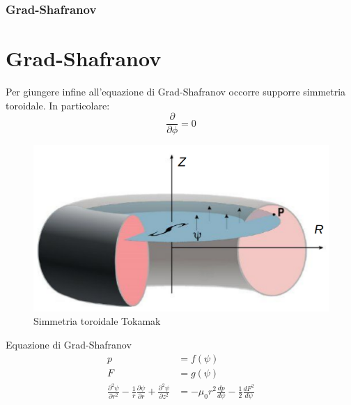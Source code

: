 \documentclass{beamer}
\begin{document}
\begin{frame}
	\frametitle{Grad-Shafranov}
	\section{Grad-Shafranov}
	\begin{minipage}[t]{0.50\textwidth}
		Per giungere infine all'equazione di Grad-Shafranov occorre supporre simmetria toroidale. In particolare:
		\begin{equation*}
			\frac{\partial}{\partial \phi}=0
		\end{equation*}

	\end{minipage}
	\begin{minipage}[t]{0.40\textwidth}
		\begin{figure}
			\includegraphics[scale=0.25]{2022-06-07-13-08-40.png}%
			\caption{Simmetria toroidale Tokamak}
		\end{figure}
	\end{minipage}
	\begin{block}{Equazione di Grad-Shafranov}
		\begin{align*}
			p                                                                                                                           & =f(\psi)                                                          \\
			F                                                                                                                           & =g(\psi)                                                          \\
			\frac{\partial^{2}\psi}{\partial r^{2}}-\frac{1}{r}\frac{\partial \psi}{\partial r}+\frac{\partial^{2}\psi}{\partial z^{2}} & =-\mu_{0}r^{2}\frac{d p}{d \psi}-\frac{1}{2}\frac{d F^{2}}{d\psi}
		\end{align*}
	\end{block}
\end{frame}
\end{document}
